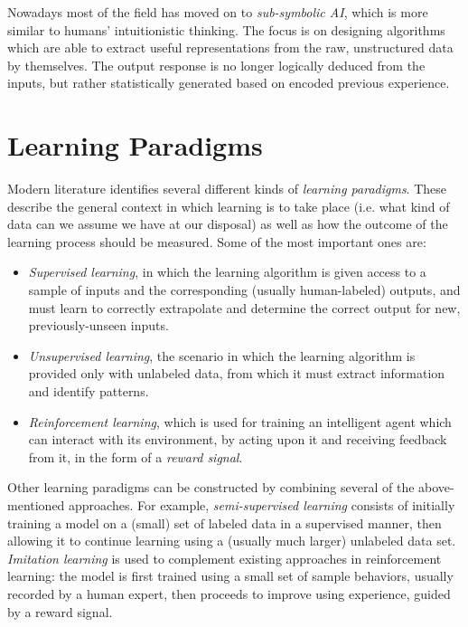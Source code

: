 Nowadays most of the field has moved on to \emph{sub-symbolic AI}, which is more similar to humans' intuitionistic thinking. The focus is on designing algorithms which are able to extract useful representations from the raw, unstructured data by themselves. The output response is no longer logically deduced from the inputs, but rather statistically generated based on encoded previous experience.

\section{Learning Paradigms}

Modern literature \cite{Goodfellow2016, Mohri2018, RusselNorvig2020} identifies several different kinds of \emph{learning paradigms}. These describe the general context in which learning is to take place (i.e. what kind of data can we assume we have at our disposal) as well as how the outcome of the learning process should be measured. Some of the most important ones are:
\begin{itemize}
    \item \emph{Supervised learning}, in which the learning algorithm is given access to a sample of inputs and the corresponding (usually human-labeled) outputs, and must learn to correctly extrapolate and determine the correct output for new, previously-unseen inputs.

    \item \emph{Unsupervised learning}, the scenario in which the learning algorithm is provided only with unlabeled data, from which it must extract information and identify patterns.

    \item \emph{Reinforcement learning}, which is used for training an intelligent agent which can interact with its environment, by acting upon it and receiving feedback from it, in the form of a \emph{reward signal}. 
\end{itemize}
Other learning paradigms can be constructed by combining several of the above-mentioned approaches. For example, \emph{semi-supervised learning} \cite{Chapelle2006} consists of initially training a model on a (small) set of labeled data in a supervised manner, then allowing it to continue learning using a (usually much larger) unlabeled data set. \emph{Imitation learning} \cite{Abbeel2004} is used to complement existing approaches in reinforcement learning: the model is first trained using a small set of sample behaviors, usually recorded by a human expert, then proceeds to improve using experience, guided by a reward signal.

